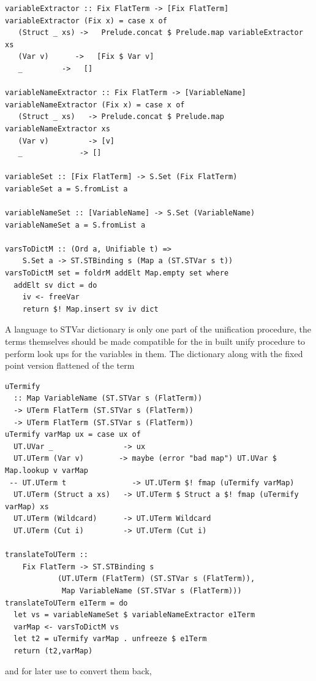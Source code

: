 \documentclass[thesis-solanki.tex]{subfiles}
\begin{document}
\begin{verbatim}
variableExtractor :: Fix FlatTerm -> [Fix FlatTerm]
variableExtractor (Fix x) = case x of
   (Struct _ xs) ->   Prelude.concat $ Prelude.map variableExtractor xs
   (Var v)      ->   [Fix $ Var v]
   _         ->   []

variableNameExtractor :: Fix FlatTerm -> [VariableName]
variableNameExtractor (Fix x) = case x of
   (Struct _ xs)   -> Prelude.concat $ Prelude.map variableNameExtractor xs
   (Var v)         -> [v]
   _             -> []

variableSet :: [Fix FlatTerm] -> S.Set (Fix FlatTerm)
variableSet a = S.fromList a

variableNameSet :: [VariableName] -> S.Set (VariableName)
variableNameSet a = S.fromList a

varsToDictM :: (Ord a, Unifiable t) =>
    S.Set a -> ST.STBinding s (Map a (ST.STVar s t))
varsToDictM set = foldrM addElt Map.empty set where
  addElt sv dict = do
    iv <- freeVar
    return $! Map.insert sv iv dict
\end{verbatim}

A language to STVar dictionary is only one part of the unification procedure, the terms themselves should be made compatible for the in
built unify procedure to perform look ups for the variables in them. The dictionary along with the fixed point version flattened of the term


\begin{verbatim}
uTermify
  :: Map VariableName (ST.STVar s (FlatTerm))
  -> UTerm FlatTerm (ST.STVar s (FlatTerm))
  -> UTerm FlatTerm (ST.STVar s (FlatTerm))
uTermify varMap ux = case ux of
  UT.UVar _                -> ux
  UT.UTerm (Var v)        -> maybe (error "bad map") UT.UVar $ Map.lookup v varMap
 -- UT.UTerm t               -> UT.UTerm $! fmap (uTermify varMap)
  UT.UTerm (Struct a xs)   -> UT.UTerm $ Struct a $! fmap (uTermify varMap) xs
  UT.UTerm (Wildcard)      -> UT.UTerm Wildcard
  UT.UTerm (Cut i)         -> UT.UTerm (Cut i)

translateToUTerm ::
    Fix FlatTerm -> ST.STBinding s
            (UT.UTerm (FlatTerm) (ST.STVar s (FlatTerm)),
             Map VariableName (ST.STVar s (FlatTerm)))
translateToUTerm e1Term = do
  let vs = variableNameSet $ variableNameExtractor e1Term
  varMap <- varsToDictM vs
  let t2 = uTermify varMap . unfreeze $ e1Term
  return (t2,varMap)
\end{verbatim}

and for later use to convert them back,
\end{document}
